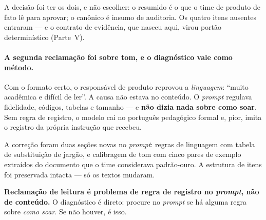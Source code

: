 \documentclass[11pt,a4paper]{article}
\begin{document}
\begin{center}
\end{center}

A decisão foi ter os dois, e não escolher: o resumido é o que o time de produto de fato lê para aprovar; o canônico é insumo de auditoria. Os quatro itens ausentes entraram --- e o contrato de evidência, que nasceu aqui, virou portão determinístico (Parte~V).

\paragraph{A segunda reclamação foi sobre tom, e o diagnóstico vale como método.} Com o formato certo, o responsável de produto reprovou a \emph{linguagem}: ``muito acadêmica e difícil de ler''. A causa não estava no conteúdo. O \emph{prompt} regulava fidelidade, códigos, tabelas e tamanho --- e \textbf{não dizia nada sobre como soar}. Sem regra de registro, o modelo cai no português pedagógico formal e, pior, imita o registro da própria instrução que recebeu.

A correção foram duas seções novas no \emph{prompt}: regras de linguagem com tabela de substituição de jargão, e calibragem de tom com cinco pares de exemplo extraídos do documento que o time considerava padrão-ouro. A estrutura de itens foi preservada intacta --- só os textos mudaram.

\begin{destaque}
\textbf{Reclamação de leitura é problema de regra de registro no \emph{prompt}, não de conteúdo.} O diagnóstico é direto: procure no \emph{prompt} se há alguma regra sobre \emph{como soar}. Se não houver, é isso.
\end{destaque}
\end{document}
